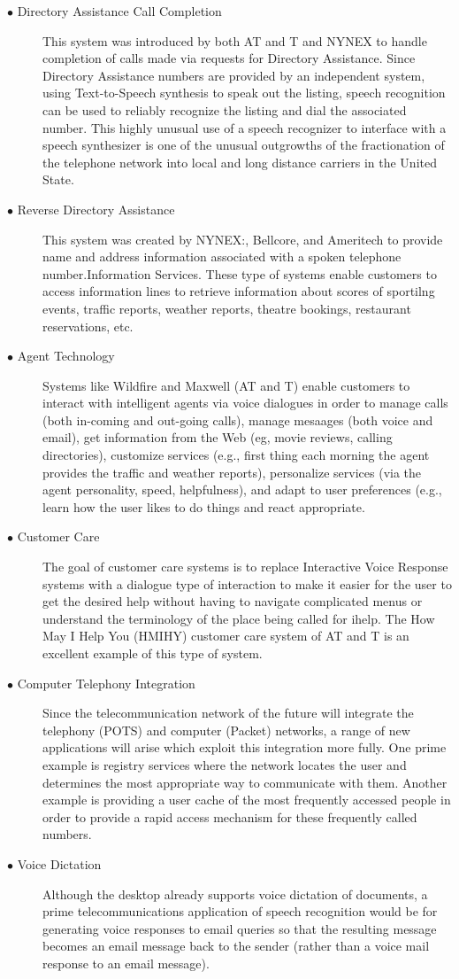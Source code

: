 \documentclass[12pt,a4paper,oneside]{memoir}
\begin{document}
\begin{description}
  \item[$\bullet$ Directory Assistance Call Completion] This system was introduced by both AT and T and NYNEX to handle completion of calls made via requests for Directory Assistance. Since Directory Assistance numbers are provided by an independent system, using Text-to-Speech synthesis to speak out the listing, speech recognition can be used to reliably recognize the listing and dial the associated number. This highly unusual use of a speech recognizer to interface with a speech synthesizer is one of the unusual outgrowths of the fractionation of the telephone network into local and long distance carriers in the United State.
  \item[$\bullet$ Reverse Directory Assistance] This system was created by NYNEX:, Bellcore, and Ameritech to provide name and address information associated with a spoken telephone number.Information Services. These type of systems enable customers to access information lines to retrieve information about scores of sportilng events, traffic reports, weather reports, theatre bookings, restaurant reservations, etc. 
  \item[$\bullet$ Agent Technology] Systems like Wildfire and Maxwell (AT and T) enable customers to interact with intelligent agents via voice dialogues in order to manage calls (both in-coming and out-going calls), manage mesaages (both voice and email), get information from the Web (eg, movie reviews, calling directories), customize services (e.g., first thing each morning the agent provides the traffic and weather reports), personalize services (via the agent personality, speed, helpfulness), and adapt to user preferences (e.g., learn how the user likes to do things and react appropriate.
  \item[$\bullet$ Customer Care] The goal of customer care systems is to replace Interactive Voice Response systems with a dialogue type of interaction to make it easier for the user to get the desired help without having to navigate complicated menus or understand the terminology of the place being called for ihelp. The How May I Help You (HMIHY) customer care system of AT and T is an excellent example of this type of system.
  \item[$\bullet$ Computer Telephony Integration] Since the telecommunication network of the future will integrate the telephony (POTS) and computer (Packet) networks, a range of new applications will arise which exploit this integration more fully. One prime example is registry services where the network locates the user and determines the most appropriate way to communicate with them. Another example is providing a user cache of the most frequently accessed people in order to provide a rapid access mechanism for these frequently called numbers.
  \item[$\bullet$ Voice Dictation]  Although the desktop already supports voice dictation of documents, a prime telecommunications application of speech recognition would be for generating voice responses to email queries so that the resulting message becomes an email message back to the sender (rather than a voice mail response to an email message).
\end{description}
\end{document}
